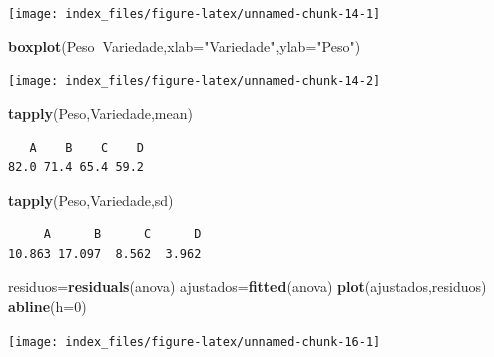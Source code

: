 \documentclass[12pt,brazil,oneside]{book}
\newenvironment{Shaded}{\begin{snugshade}}{\end{snugshade}}
\newcommand{\DataTypeTok}[1]{\textcolor[rgb]{0.13,0.29,0.53}{#1}}
\newcommand{\DecValTok}[1]{\textcolor[rgb]{0.00,0.00,0.81}{#1}}
\newcommand{\KeywordTok}[1]{\textcolor[rgb]{0.13,0.29,0.53}{\textbf{#1}}}
\newcommand{\NormalTok}[1]{#1}
\newcommand{\OperatorTok}[1]{\textcolor[rgb]{0.81,0.36,0.00}{\textbf{#1}}}
\newcommand{\StringTok}[1]{\textcolor[rgb]{0.31,0.60,0.02}{#1}}
\begin{document}
\begin{center}\texttt{[image: index\_files/figure-latex/unnamed-chunk-14-1]} \end{center}

\begin{Shaded}
\begin{Highlighting}[]
\KeywordTok{boxplot}\NormalTok{(Peso}\OperatorTok{~}\NormalTok{Variedade,}\DataTypeTok{xlab=}\StringTok{"Variedade"}\NormalTok{,}\DataTypeTok{ylab=}\StringTok{"Peso"}\NormalTok{)}
\end{Highlighting}
\end{Shaded}

\begin{center}\texttt{[image: index\_files/figure-latex/unnamed-chunk-14-2]} \end{center}

\begin{Shaded}
\begin{Highlighting}[]
\KeywordTok{tapply}\NormalTok{(Peso,Variedade,mean)}
\end{Highlighting}
\end{Shaded}

\begin{verbatim}
   A    B    C    D 
82.0 71.4 65.4 59.2 
\end{verbatim}

\begin{Shaded}
\begin{Highlighting}[]
\KeywordTok{tapply}\NormalTok{(Peso,Variedade,sd)}
\end{Highlighting}
\end{Shaded}

\begin{verbatim}
     A      B      C      D 
10.863 17.097  8.562  3.962 
\end{verbatim}

\begin{Shaded}
\begin{Highlighting}[]
\NormalTok{residuos=}\KeywordTok{residuals}\NormalTok{(anova)}
\NormalTok{ajustados=}\KeywordTok{fitted}\NormalTok{(anova)}
\KeywordTok{plot}\NormalTok{(ajustados,residuos)}
\KeywordTok{abline}\NormalTok{(}\DataTypeTok{h=}\DecValTok{0}\NormalTok{)}
\end{Highlighting}
\end{Shaded}

\begin{center}\texttt{[image: index\_files/figure-latex/unnamed-chunk-16-1]} \end{center}
\end{document}
